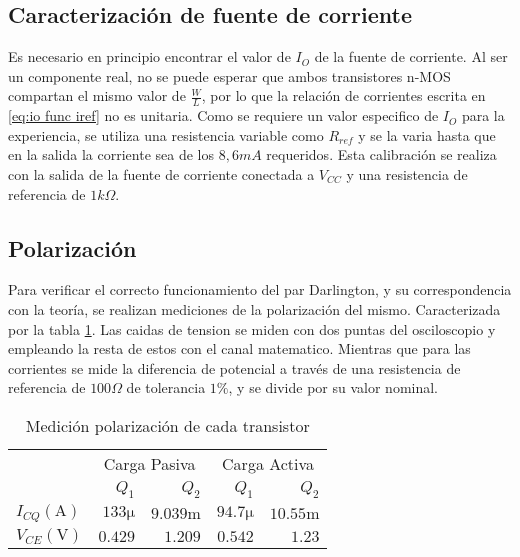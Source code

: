 \subsection{Caracterización de fuente de corriente}

Es necesario en principio encontrar el valor de $I_O$ de la fuente de corriente. Al ser un componente real, no se puede esperar que ambos transistores n-MOS compartan el mismo valor de $\frac{W}{L}$, por lo que la relación de corrientes escrita en \ref{eq:io func iref} no es unitaria.
Como se requiere un valor especifico de $I_O$ para la experiencia, se utiliza una resistencia variable como $R_{ref}$ y se la varia hasta que en la salida la corriente sea de los $8,6 mA$ requeridos. Esta calibración se realiza con la salida de la fuente de corriente conectada a $V_{CC}$ y una resistencia de referencia de $1k\Omega$.

\subsection{Polarización}

Para verificar el correcto funcionamiento del par Darlington, y su correspondencia con la teoría, se realizan mediciones de la polarización del mismo. Caracterizada por la tabla \ref{table:pola medida}. Las caidas de tension se miden con dos puntas del osciloscopio y empleando la resta de estos con el canal matematico.
Mientras que para las corrientes se mide la diferencia de potencial a través de  una resistencia de referencia de $100 \Omega$ de tolerancia $1\%$, y se divide por su valor nominal.

\begin{table}[ht]
    \centering
    \begin{tabular}{|l|r|r|r|r|}
        \hline
        \multirow{2}{*}{} & \multicolumn{2}{c|}{Carga Pasiva} & \multicolumn{2}{c|}{Carga Activa} \\ \cline{2-5} 
         & $Q_1$ & $Q_2$ & $Q_1$ & $Q_2$ \\ \hline

        $I_{CQ} (\si{\ampere})$ & $133 \si{\micro}$& $9.039\si{\milli}$ & $94.7 \si{\micro}$& $10.55\si{\milli}$\\
        $V_{CE} (\si{\volt})$   & $0.429$            & $1.209$ & $0.542$ & $1.23$ \\ \hline       
    \end{tabular}
    \caption{Medición polarización de cada transistor}
    \label{table:pola medida}
\end{table}

